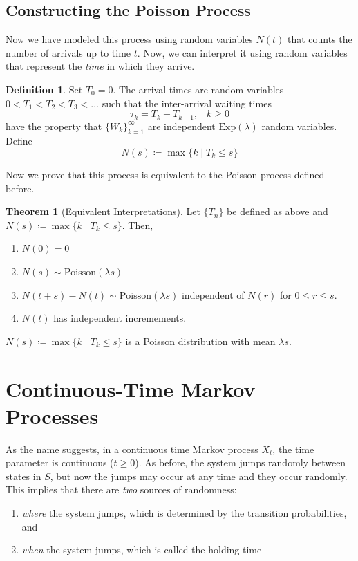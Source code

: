 \documentclass{article}
\theoremstyle{definition}
\newtheorem{theorem}{Theorem}[section]
\theoremstyle{remark}
\theoremstyle{definition}
\newtheorem{definition}{Definition}[section]
\begin{document}
\subsection{Constructing the Poisson Process}

Now we have modeled this process using random variables $N(t)$ that counts the number of arrivals up to time $t$. Now, we can interpret it using random variables that represent the \textit{time} in which they arrive. 

\begin{definition}
Set $T_0 = 0$. The arrival times are random variables $0 < T_1 < T_2 < T_3 < \ldots$ such that the inter-arrival waiting times
\[\tau_k = T_k - T_{k-1}, \;\;\; k \geq 0\]
have the property that $\{W_k\}_{k=1}^\infty$ are independent $\mathrm{Exp}(\lambda)$ random variables. Define 
\[N(s) \coloneqq \max\{k \mid T_k \leq s \}\]
\end{definition}

Now we prove that this process is equivalent to the Poisson process defined before. 

\begin{theorem}[Equivalent Interpretations]
Let $\{T_n\}$ be defined as above and $N(s) \coloneqq \max\{k \mid T_k \leq s \}$. Then, 
\begin{enumerate}
    \item $N(0) = 0$
    \item $N(s) \sim \mathrm{Poisson}(\lambda s)$ 
    \item $N(t + s) - N(t) \sim \mathrm{Poisson}(\lambda s)$ independent of $N(r)$ for $0 \leq r \leq s$. 
    \item $N(t)$ has independent incremements. 
\end{enumerate}

$N(s) \coloneqq \max\{k \mid T_k \leq s \}$ is a Poisson distribution with mean $\lambda s$. 
\end{theorem}


\section{Continuous-Time Markov Processes}

As the name suggests, in a continuous time Markov process $X_t$, the time parameter is continuous ($t \geq 0$). As before, the system jumps randomly between states in $S$, but now the jumps may occur at any time and they occur randomly. This implies that there are \textit{two} sources of randomness:
\begin{enumerate}
    \item \textit{where} the system jumps, which is determined by the transition probabilities, and 
    \item \textit{when} the system jumps, which is called the holding time
\end{enumerate}
\end{document}

